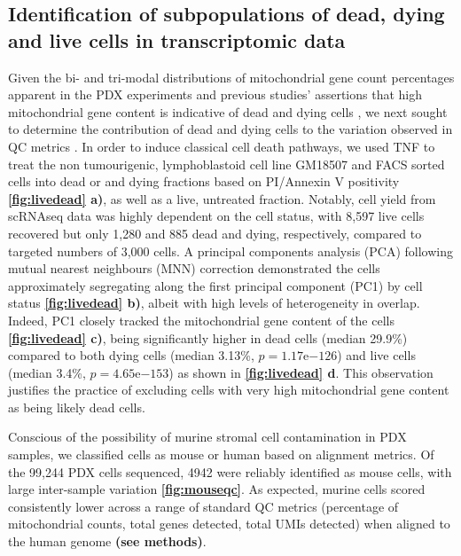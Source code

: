  \subsection{Identification of subpopulations of dead, dying and live cells in transcriptomic data}
Given the bi- and tri-modal distributions of mitochondrial gene count percentages \cite{o2019dissociation} apparent in the PDX experiments and previous studies' assertions that high mitochondrial gene content is indicative of dead and dying cells \cite{ilicic2016classification, zhao2002mitochondrial}, we next sought to determine the contribution of dead and dying cells to the variation observed in QC metrics  \cite{o2019dissociation}. In order to induce classical cell death pathways, we used TNF\textalpha    
  \cite{carswell1975endotoxin, sedger2014tnf} to treat the non tumourigenic, lymphoblastoid cell line GM18507 and FACS sorted cells into dead or and dying fractions based on PI/Annexin V positivity \textbf{\autoref{fig:livedead} a)}, as well as a live, untreated fraction. Notably, cell yield from scRNAseq data was highly dependent on the cell status, with 8,597 live cells recovered but only 1,280 and 885 dead and dying, respectively, compared to targeted numbers of 3,000 cells. 
A principal components analysis (PCA) following mutual nearest neighbours (MNN) correction \cite{haghverdi2018batch} demonstrated the cells approximately segregating along the first principal component (PC1) by cell status \textbf{\autoref{fig:livedead} b)}, albeit with high levels of heterogeneity in overlap. Indeed, PC1 closely tracked the mitochondrial gene content of the cells \textbf{\autoref{fig:livedead} c)}, being significantly higher in dead cells (median 29.9\%) compared to both dying cells (median 3.13\%, $p=1.17 \mathrm{e}{-126}$) and live cells (median 3.4\%, $p=4.65 \mathrm{e}{-153}$) as shown in \textbf{\autoref{fig:livedead} d}.
This observation justifies the practice of excluding cells with very high mitochondrial gene content as being likely dead cells.

Conscious of the possibility of murine stromal cell contamination in PDX samples, we classified cells as mouse or human based on alignment metrics. Of the 99,244 PDX cells sequenced, 4942 were reliably identified as mouse cells, with large inter-sample variation \textbf{\autoref{fig:mouseqc}}.
As expected, murine cells scored consistently lower across a range of standard QC metrics (percentage of mitochondrial counts, total genes detected, total \ac{UMIs} detected) when aligned to the human genome \textbf{(see methods)}.

